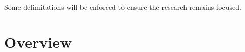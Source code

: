 Some delimitations will be enforced to ensure the research remains focused.  




\section{Overview}

